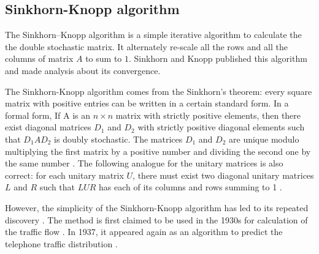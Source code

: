 \subsection{Sinkhorn-Knopp algorithm}


The Sinkhorn–Knopp algorithm is a
simple iterative algorithm to calculate the the double stochastic matrix. It alternately re-scale all the rows and all the columns of matrix $A$ to sum to $1$. Sinkhorn and Knopp \cite{sinkhorn1967concerning} published this algorithm and made analysis about its convergence.



The Sinkhorn-Knopp algorithm comes from the Sinkhorn's theorem\cite{sinkhorn1964relationship,vialard2019elementary}: 
every square matrix with positive entries can be written in a certain standard form. In a formal form, If A is an $n × n$ matrix with strictly positive elements, then there exist diagonal matrices $D_1$ and $D_2$ with strictly positive diagonal elements such that $D_1 A D_2$ is doubly stochastic. The matrices $D_1$ and $D_2$ are unique modulo multiplying the first matrix by a positive number and dividing the second one by the same number \cite{marshall1968scaling}. 
The following analogue for the unitary matrices is also correct: for each unitary matrix $U$, there must exist two diagonal unitary matrices $L$ and $R$ such that $LUR$ has each of its columns and rows summing to 1 \cite{idel2015sinkhorn}.

However, the simplicity of the Sinkhorn-Knopp algorithm has led to its repeated discovery \cite{knight2008sinkhorn}.
The method is first claimed to be used in the 1930s for calculation of the traffic flow \cite{bregman1967proof}. In 1937, it appeared again as an algorithm to predict the telephone traffic distribution \cite{kruithof1937telefoonverkeersrekening}.



